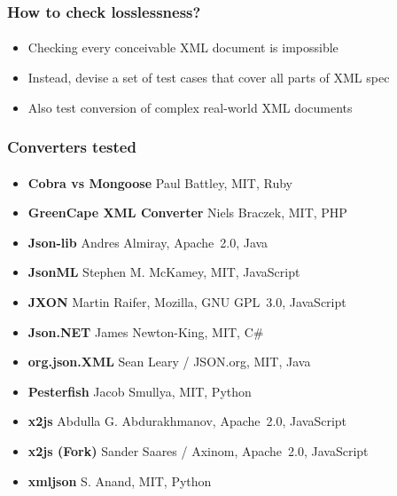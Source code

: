 \documentclass[
    alternativetitlepage=alternativ,
    cornerlogo=hgi_nds_logo2,
    sectionoverview,
]{rubpresentation}
\begin{document}
\begin{frame}
  \frametitle{How to check losslessness?}
  \framesubtitle{}
  \begin{itemize}
    \item{} Checking every conceivable XML document is impossible
    \item{} Instead, devise a set of test cases that cover all parts of XML spec
    \item{} Also test conversion of complex real-world XML documents
  \end{itemize}
\end{frame}

\begingroup
  \begin{frame}[fragile]
    \vspace{-1cm}
    \begin{center}
      
    \end{center}
  \end{frame}
\endgroup

\begingroup
  \begin{frame}[fragile]
    \vspace{-1cm}
    \begin{center}
      
    \end{center}
  \end{frame}
\endgroup

\begin{frame}
  \frametitle{Converters tested}
  \framesubtitle{}
  \begin{itemize}
    \item{} \textbf{Cobra vs Mongoose} Paul Battley, MIT, Ruby
    \item{} \textbf{GreenCape XML Converter} Niels Braczek, MIT, PHP
    \item{} \textbf{Json-lib} Andres Almiray, Apache~2.0, Java
    \item{} \textbf{JsonML} Stephen M. McKamey, MIT, JavaScript
    \item{} \textbf{JXON} Martin Raifer, Mozilla, GNU GPL~3.0, JavaScript
    \item{} \textbf{Json.NET} James Newton-King, MIT, C\#
    \item{} \textbf{org.json.XML} Sean Leary / JSON.org, MIT, Java
    \item{} \textbf{Pesterfish} Jacob Smullya, MIT, Python
    \item{} \textbf{x2js} Abdulla G. Abdurakhmanov, Apache~2.0, JavaScript
    \item{} \textbf{x2js (Fork)} Sander Saares / Axinom, Apache~2.0, JavaScript
    \item{} \textbf{xmljson} S. Anand, MIT, Python
  \end{itemize}
\end{frame}
\end{document}
